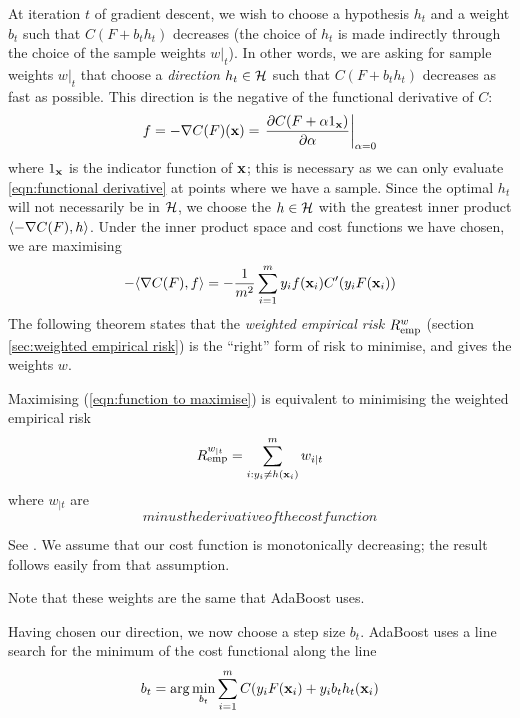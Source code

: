 At iteration $t$ of gradient descent, we wish to choose a hypothesis $h_t$ and
a weight $b_t$ such that $C(F + b_t h_t)$ decreases (the choice of
$h_t$ is made indirectly through the choice of the sample weights
$w|_t$).  In other words, we are asking for sample weights $w|_t$ that
choose a \emph{direction} $h_t \in \mathcal{H}$ such that $C(F + b_t h_t)$
decreases as fast as possible.  This direction is the negative of the
functional derivative of $C$:
%
\begin{equation}
f = -\nabla C(F)(\mathbf{x}) = \left. \frac{\partial C(F + \alpha
1_{\mathbf{x}})}{\partial \alpha} \right|_{\alpha = 0}
\label{eqn:functional derivative}
\end{equation}
%
where $1_{\mathbf{x}}$ is the indicator function of $\mathbf{x}$; this is
necessary as we can only evaluate \ref{eqn:functional derivative} at
points where we have a sample.  Since the optimal $h_t$ will not
necessarily be in $\mathcal{H}$, we choose the $h \in \mathcal{H}$ with the
greatest inner product $\langle {-\nabla C(F)} , {h} \rangle$.  Under the inner
product space and cost functions we have chosen, we are maximising
%
\begin{equation}
- \langle {\nabla C(F)} , {f} \rangle = - \frac{1}{m^2} \sum_{i=1}^{m} y_i f(\mathbf{x}_i)
  C'(y_i F(\mathbf{x}_i))
\label{eqn:function to maximise}
\end{equation}
%
The following theorem states that the \emph{weighted empirical risk}
$R_{\mathrm{emp}}^{w}$ (section \ref{sec:weighted empirical risk}) is the
``right'' form of risk to minimise, and gives the weights $w$.

\begin{theorem}
Maximising (\ref{eqn:function to maximise}) is equivalent to
minimising the weighted empirical risk
%
\begin{equation}
R_{\mathrm{emp}}^{w_{|t}} = \sum_{i:y_i \neq h(\mathbf{x}_i)}^{m} w_{i|t}
\end{equation}
%
where $w_{|t}$ are
%
\begin{equation}
minus the derivative of the cost function
\label{eqn:gradient sample weights}
\end{equation}

\proof See \cite{Mason99}.  We assume that our cost function is
monotonically decreasing; the result follows easily from that
assumption.
\end{theorem}

Note that these weights are the same that AdaBoost uses.

Having chosen our direction, we now choose a step size $b_t$.
AdaBoost uses a line search for the minimum of the cost functional
along the line
%
\begin{equation}
b_t = \arg \min_{b_t} \sum_{i=1}^{m} C(y_i F(\mathbf{x}_i) + y_i b_t h_t(\mathbf{x}_i)
\end{equation}
%

